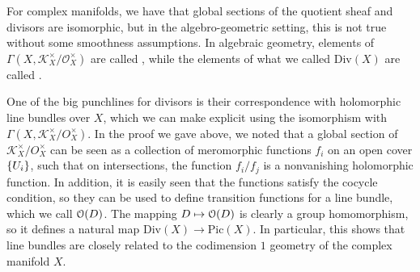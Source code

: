 %
\begin{rem*}
For complex manifolds, we have that global sections of the quotient sheaf and divisors
are isomorphic, but in the algebro-geometric setting, this is not true without some
smoothness assumptions. In algebraic geometry, elements of
$\Gamma(X, \mathcal{K}_X^\times/\mathcal{O}_X^\times)$ are called ,
while the elements of what we called $\mathrm{Div}(X)$ are called .
\end{rem*}
%
One of the big punchlines for divisors is their correspondence with holomorphic
line bundles over $X$, which we can make explicit using the isomorphism with
$\Gamma(X, \mathcal{K}^\times_X / O^\times_X)$. In the proof we gave above, we noted
that a global section of $\mathcal{K}^\times_X / O^\times_X$ can be seen as a collection
of meromorphic functions $f_i$ on an open cover $\left\lbrace U_i \right\rbrace$, such that on intersections,
the function $f_i/f_j$ is a nonvanishing holomorphic function. In addition, it is easily
seen that the functions satisfy the cocycle condition, so they can be used
to define transition functions for a line bundle, which we call $\mathcal{O}(D)$. The
mapping $D \mapsto \mathcal{O}(D)$ is clearly a group homomorphism, so it defines a natural
map $\mathrm{Div}(X) \to \mathrm{Pic}(X)$. In particular, this shows that line bundles
are closely related to the codimension $1$ geometry of the complex manifold $X$. \\

